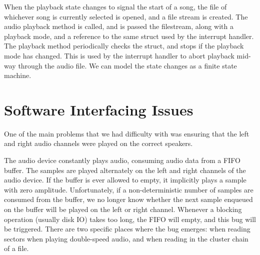 \documentclass[12pt]{article}
\begin{document}
When the playback state changes to signal the start of a song,
the file of whichever song is currently selected is opened,
and a file stream is created.
The audio playback method is called, and is passed the filestream,
along with a playback mode, and a reference to the same struct used by the
interrupt handler.
The playback method periodically checks the struct, and stops if the playback
mode has changed.
This is used by the interrupt handler to abort playback mid-way through the audio
file.
We can model the state changes as a finite state machine.


\section{Software Interfacing Issues}

One of the main problems that we had difficulty with was ensuring that the
left and right audio channels were played on the correct speakers.

The audio device constantly plays audio, consuming audio data from
a FIFO buffer.
The samples are played alternately on the left and right channels of
the audio device.
If the buffer is ever allowed to empty, it implicitly plays a sample with zero
amplitude.
Unfortunately, if a non-deterministic number of samples are consumed from the
buffer, we no longer know whether the next sample enqueued on the buffer will
be played on the left or right channel.
Whenever a blocking operation (usually disk IO) takes too long, the FIFO will
empty, and this bug will be triggered.
There are two specific places where the bug emerges: when reading sectors when
playing double-speed audio, and when reading in the cluster chain of a file.
\end{document}
